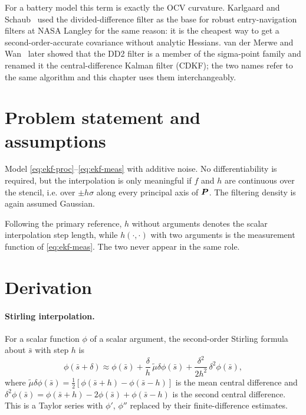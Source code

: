 For a battery model this term is exactly the OCV curvature. Karlgaard and
Schaub~\cite{karlgaard2007huber} used the divided-difference filter as the base for robust
entry-navigation filters at NASA Langley for the same reason: it is the cheapest way to get a
second-order-accurate covariance without analytic Hessians. van der Merwe and
Wan~\cite{vandermerwe2001srukf} later showed that the DD2 filter is a member of the
sigma-point family and renamed it the central-difference Kalman filter (CDKF); the two names
refer to the same algorithm and this chapter uses them interchangeably.

\section{Problem statement and assumptions}
Model \eqref{eq:ekf-proc}--\eqref{eq:ekf-meas} with additive noise. No differentiability is
required, but the interpolation is only meaningful if $f$ and $h$ are continuous over the
stencil, i.e. over $\pm h\sigma$ along every principal axis of $\bm{P}$. The filtering density
is again assumed Gaussian.

\begin{remark}[Notation]
Following the primary reference, $h$ without arguments denotes the scalar interpolation step
length, while $h(\cdot,\cdot)$ with two arguments is the measurement function of
\eqref{eq:ekf-meas}. The two never appear in the same role.
\end{remark}

\section{Derivation}
\paragraph{Stirling interpolation.} For a scalar function $\phi$ of a scalar argument, the
second-order Stirling formula about $\bar{s}$ with step $h$ is
\begin{equation}
\phi(\bar{s}+\delta) \approx \phi(\bar{s}) + \frac{\delta}{h}\,\tilde\mu\delta\phi(\bar s)
 + \frac{\delta^2}{2h^2}\,\delta^2\phi(\bar s),
\label{eq:cdkf-stirling}
\end{equation}
where $\tilde\mu\delta\phi(\bar s) = \tfrac12[\phi(\bar s{+}h)-\phi(\bar s{-}h)]$ is the mean
central difference and $\delta^2\phi(\bar s) = \phi(\bar s{+}h)-2\phi(\bar s)+\phi(\bar s{-}h)$
is the second central difference. This is a Taylor series with $\phi'$, $\phi''$ replaced by
their finite-difference estimates.

